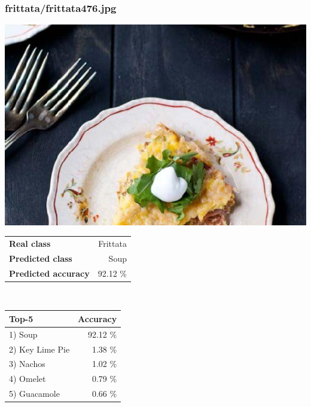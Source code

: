 \subsubsection{frittata/frittata476.jpg}

\begin{minipage}[t]{0.4\textwidth}
	\vspace{0pt}
	\includegraphics[width=\linewidth]{images/evaluation-images/frittata/frittata476.jpg}
\end{minipage}
\hfill
\begin{minipage}[t]{0.5\textwidth}
	\vspace{0pt}\raggedright
	\begin{tabularx}{\textwidth}{X r}
		\small \textbf{Real class} & \small Frittata\\
		\small \textbf{Predicted class} & \small Soup\\
		\small \textbf{Predicted accuracy} & \small 92.12 \%
    \end{tabularx}\\
    
    \vspace{6pt}
	\begin{tabularx}{\textwidth}{X r}
        \small \textbf{Top-5} & \small \textbf{Accuracy} \\
        \hline
		\small 1) Soup & \small 92.12 \%\\\small 2) Key Lime Pie & \small 1.38 \%\\\small 3) Nachos & \small 1.02 \%\\\small 4) Omelet & \small 0.79 \%\\\small 5) Guacamole & \small 0.66 \%
    \end{tabularx}
\end{minipage}
    
